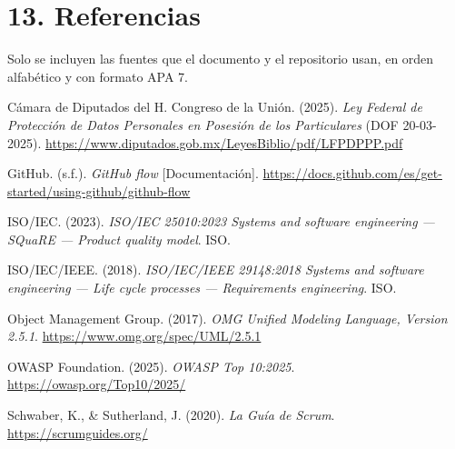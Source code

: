 \section{13. Referencias}\label{referencias}

Solo se incluyen las fuentes que el documento y el repositorio usan, en orden alfabético y con formato APA 7.

Cámara de Diputados del H. Congreso de la Unión. (2025). \emph{Ley Federal de Protección de Datos Personales en Posesión de los Particulares} (DOF 20-03-2025). \url{https://www.diputados.gob.mx/LeyesBiblio/pdf/LFPDPPP.pdf}

GitHub. (s.f.). \emph{GitHub flow} [Documentación]. \url{https://docs.github.com/es/get-started/using-github/github-flow}

ISO/IEC. (2023). \emph{ISO/IEC 25010:2023 Systems and software engineering --- SQuaRE --- Product quality model}. ISO.

ISO/IEC/IEEE. (2018). \emph{ISO/IEC/IEEE 29148:2018 Systems and software engineering --- Life cycle processes --- Requirements engineering}. ISO.

Object Management Group. (2017). \emph{OMG Unified Modeling Language, Version 2.5.1}. \url{https://www.omg.org/spec/UML/2.5.1}

OWASP Foundation. (2025). \emph{OWASP Top 10:2025}. \url{https://owasp.org/Top10/2025/}

Schwaber, K., \& Sutherland, J. (2020). \emph{La Guía de Scrum}. \url{https://scrumguides.org/}
